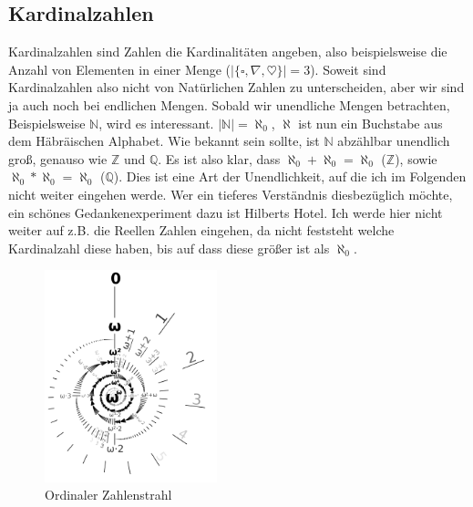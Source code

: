 \documentclass{scrartcl}
\begin{document}
\subsection{Kardinalzahlen}
Kardinalzahlen sind Zahlen die Kardinalitäten angeben, also beispielsweise die
Anzahl von Elementen in einer Menge ($|\{\square, \nabla, \heartsuit \} | =
3$). Soweit sind Kardinalzahlen also nicht von Natürlichen Zahlen zu
unterscheiden, aber wir sind ja auch noch bei endlichen Mengen. Sobald wir
unendliche Mengen betrachten, Beispielsweise $\mathbb{N}$, wird es interessant.
$|\mathbb{N}| = \aleph_0$, $\aleph$ ist nun ein Buchstabe aus dem Häbräischen
Alphabet. Wie bekannt sein sollte, ist $\mathbb{N}$ abzählbar unendlich groß,
genauso wie $\mathbb{Z}$ und $\mathbb{Q}$. Es ist also klar, dass $\aleph_0 +
\aleph_0 = \aleph_0$ ($\mathbb{Z}$), sowie $\aleph_0 * \aleph_0 = \aleph_0$
($\mathbb{Q}$). Dies ist eine Art der Unendlichkeit, auf die ich im Folgenden
nicht weiter eingehen werde. Wer ein tieferes Verständnis diesbezüglich möchte,
ein schönes Gedankenexperiment dazu ist Hilberts Hotel. Ich werde hier nicht
weiter auf z.B. die Reellen Zahlen eingehen, da nicht feststeht welche
Kardinalzahl diese haben, bis auf dass diese größer ist als $\aleph_0$.


\begin{figure}
    \centering
    \includegraphics[width=5cm]{ordinal.png}
    \caption{\label{fig:ordinal.png}Ordinaler Zahlenstrahl}
\end{figure}
\end{document}
